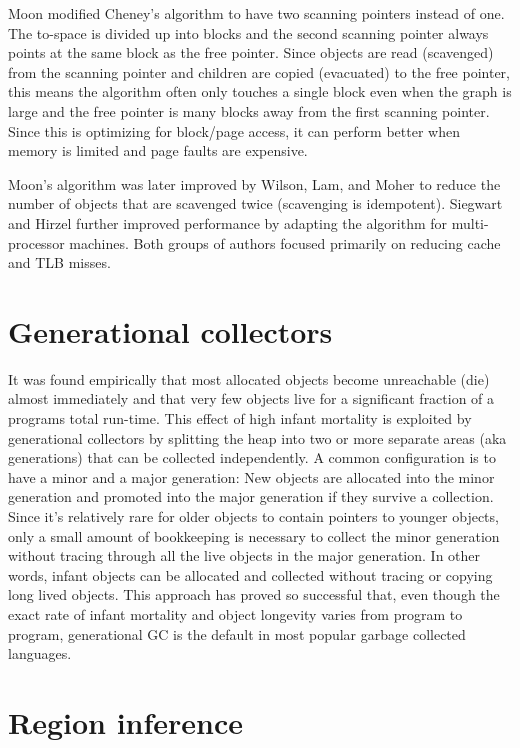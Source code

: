 \documentclass[a4paper,oneside]{memoir}
\begin{document}
Moon modified Cheney's algorithm to have two scanning pointers instead of one.
The to-space is divided up into blocks and the second scanning pointer always
points at the same block as the free pointer. Since objects are read (scavenged)
from the scanning pointer and children are copied (evacuated) to the free pointer,
this means the algorithm often only touches a single block even when the graph
is large and the free pointer is many blocks away from the first scanning pointer.
Since this is optimizing for block/page access, it can perform better when memory
is limited and page faults are expensive.

Moon's algorithm was later improved by Wilson, Lam, and Moher to reduce the
number of objects that are scavenged twice (scavenging is idempotent). Siegwart
and Hirzel further improved performance by adapting the algorithm for
multi-processor machines. Both groups of authors focused primarily on reducing
cache and TLB misses.

\section{Generational collectors}

It was found empirically that most allocated objects become unreachable (die)
almost immediately and that very few objects live for a significant fraction
of a programs total run-time. This effect of high infant mortality is exploited
by generational collectors by splitting the heap into two or more separate areas
(aka generations) that can be collected independently. A common configuration is
to have a minor and a major generation: New objects are allocated into the minor
generation and promoted into the major generation if they survive a collection.
Since it's relatively rare for older objects to contain pointers to younger
objects, only a small amount of bookkeeping is necessary to collect the minor
generation without tracing through all the live objects in the major generation.
In other words, infant objects can be allocated and collected without tracing or
copying long lived objects. This approach has proved so successful that, even
though the exact rate of infant mortality and object longevity varies from
program to program, generational GC is the default in most popular garbage
collected languages.

\section{Region inference}
\end{document}
